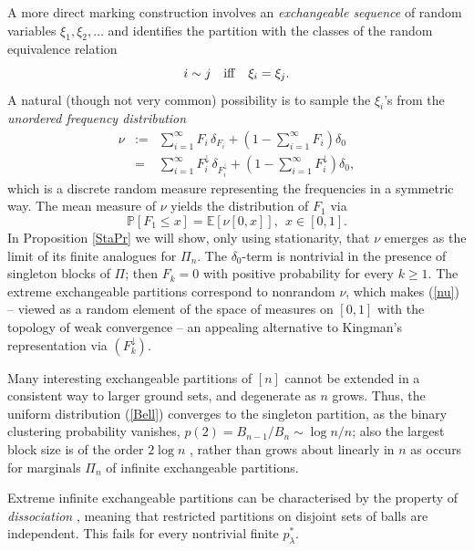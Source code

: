 \documentclass{article}
\begin{document}
A more direct marking construction involves an {\it exchangeable sequence} of random variables $\xi_1,\xi_2,\ldots$ and identifies the partition with the classes of the random equivalence relation
$$i\sim j\quad{\rm iff}\quad \xi_i=\xi_j.$$
A natural (though not very common)  possibility is to sample the $\xi_i$'s from the 
{\it unordered frequency distribution}
\begin{eqnarray}\label{nu}
\nu&:=&\sum_{i=1}^\infty F_i\,\delta_{F_i}+ \left(1-\sum_{i=1}^\infty {F_i}\right)\delta_0 \\ \nonumber
&=&\sum_{i=1}^\infty F_i^\downarrow \,\delta_{F_i^\downarrow}+\left(1-\sum_{i=1}^\infty {F_i^\downarrow}\right)\delta_0,
\end{eqnarray}
which is a  discrete random measure
representing the frequencies in a symmetric way.  
The mean measure of $\nu$ yields the distribution of $F_1$ via
$${\mathbb P}[F_1\leq x]={\mathbb E}[\nu[0,x]], ~~x\in[0,1].$$
In Proposition \ref{StaPr} we will show, only using stationarity, that $\nu$ emerges as the limit of its finite analogues for $\Pi_n$.
The $\delta_0$-term is nontrivial in the presence of singleton blocks of  $\Pi$; then $F_k=0$ with positive probability for every $k\geq 1$.
The extreme exchangeable partitions correspond to nonrandom $\nu$, which makes (\ref{nu}) -- viewed as 
a random element of  the space of measures on $[0,1]$ with the topology of  
weak convergence -- an appealing alternative to Kingman's representation via $(F_k^\downarrow)$.


Many interesting  exchangeable partitions of $[n]$ cannot be extended in a consistent way to larger ground sets, and degenerate as $n$ grows.
Thus, the uniform distribution (\ref{Bell}) converges to the singleton partition, as the binary clustering probability vanishes,
$p(2) = B_{n-1}/B_n \sim \log n / n$; also the largest block size is of the order $2\log n$ 
\cite{Sachkov}, rather than grows about linearly in $n$ as occurs for marginals $\Pi_n$ of infinite exchangeable partitions.


Extreme infinite exchangeable partitions can be characterised by the property of {\it dissociation} \cite{Kallenberg}, meaning that restricted partitions on disjoint sets of balls are independent.
This fails for  every nontrivial finite $p_\lambda^*$.
\end{document}
